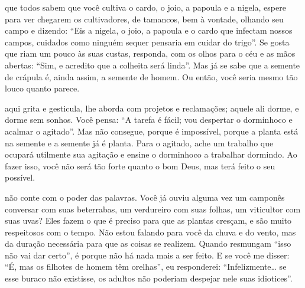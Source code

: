  que todos sabem que você cultiva o cardo, o joio, a papoula e a
nigela, espere para ver chegarem os cultivadores, de tamancos, bem à
vontade, olhando seu campo e dizendo: ``Eis a nigela, o joio, a papoula
e o cardo que infectam nossos campos, cuidados como ninguém sequer
pensaria em cuidar do trigo''. Se gosta que riam um pouco às suas
custas, responda, com os olhos para o céu e as mãos abertas: ``Sim, e
acredito que a colheita será linda''. Mas já se sabe que a semente de
crápula é, ainda assim, a semente de homem. Ou então, você seria mesmo
tão louco quanto parece. \enlargethispage{\baselineskip}

\pagebreak

 aqui grita e gesticula, lhe aborda com projetos e reclamações;
aquele ali dorme, e dorme sem sonhos. Você pensa: ``A tarefa é fácil;
vou despertar o dorminhoco e acalmar o agitado''. Mas não consegue,
porque é impossível, porque a planta está na semente e a semente já é
planta. Para o agitado, ache um trabalho que ocupará utilmente sua
agitação e ensine o dorminhoco a trabalhar dormindo. Ao fazer isso, você
não será tão forte quanto o bom Deus, mas terá feito o seu possível.



 não conte com o poder das palavras. Você já ouviu alguma
vez um camponês conversar com suas beterrabas, um verdureiro com suas
folhas, um viticultor com suas uvas? Eles fazem o que é preciso para que
as plantas cresçam, e são muito respeitosos com o tempo. Não estou
falando para você da chuva e do vento, mas da duração necessária para
que as coisas se realizem. Quando resmungam ``isso não vai dar certo'',
é porque não há nada mais a ser feito. E se você me disser: ``É, mas os
filhotes de homem têm orelhas'', eu responderei: ``Infelizmente\ldots{} se
esse buraco não existisse, os adultos não poderiam despejar nele suas
idiotices''.


\pagebreak
\thispagestyle{empty}

